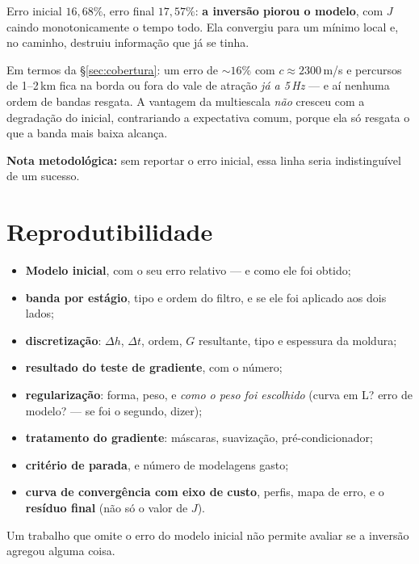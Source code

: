 \documentclass[11pt,a4paper,oneside]{report}
\begin{document}
\begin{armadilha}
Erro inicial $16{,}68\%$, erro final $17{,}57\%$: \textbf{a invers\~ao piorou o
modelo}, com $J$ caindo monotonicamente o tempo todo. Ela convergiu para um
m\'inimo local e, no caminho, destruiu informa\c{c}\~ao que j\'a se tinha.

Em termos da §\ref{sec:cobertura}: um erro de $\sim16\%$ com
$c\approx2300$\,m/s e percursos de 1--2\,km fica na borda ou fora do vale de
atra\c{c}\~ao \emph{j\'a a 5\,Hz} --- e a\'i nenhuma ordem de bandas resgata.
A vantagem da multiescala \emph{n\~ao} cresceu com a degrada\c{c}\~ao do
inicial, contrariando a expectativa comum, porque ela s\'o resgata o que a
banda mais baixa alcan\c{c}a.

\textbf{Nota metodol\'ogica:} sem reportar o erro inicial, essa linha seria
indistingu\'ivel de um sucesso.
\end{armadilha}

\section{Reprodutibilidade}

\begin{pratica}
\begin{itemize}[leftmargin=*, itemsep=1pt]
\item \textbf{Modelo inicial}, com o seu erro relativo --- e como ele foi
obtido;
\item \textbf{banda por est\'agio}, tipo e ordem do filtro, e se ele foi
aplicado aos dois lados;
\item \textbf{discretiza\c{c}\~ao}: $\Delta h$, $\Delta t$, ordem, $G$
resultante, tipo e espessura da moldura;
\item \textbf{resultado do teste de gradiente}, com o n\'umero;
\item \textbf{regulariza\c{c}\~ao}: forma, peso, e \emph{como o peso foi
escolhido} (curva em L? erro de modelo? --- se foi o segundo, dizer);
\item \textbf{tratamento do gradiente}: m\'ascaras, suaviza\c{c}\~ao,
pr\'e-condicionador;
\item \textbf{crit\'erio de parada}, e n\'umero de modelagens gasto;
\item \textbf{curva de converg\^encia com eixo de custo}, perfis, mapa de
erro, e o \textbf{res\'iduo final} (n\~ao s\'o o valor de $J$).
\end{itemize}
Um trabalho que omite o erro do modelo inicial n\~ao permite avaliar se a
invers\~ao agregou alguma coisa.
\end{pratica}
\end{document}
